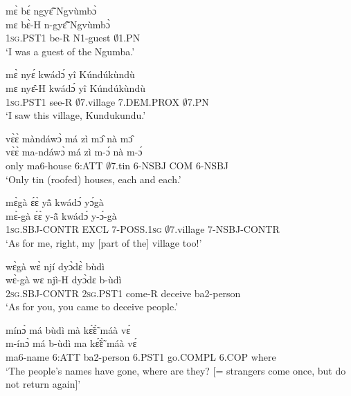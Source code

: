\begin{exe} 
\exC\label{42}
  \glll   mɛ̀ bɛ́ ngyɛ̃̂ Ngvùmbɔ̀ \\
          mɛ bɛ̀-H n-gyɛ̃̂ Ngvùmbɔ̀ \\
           1\textsc{sg}.PST1 be-R N1-guest $\emptyset$1.PN  \\
    \trans `I was a guest of the Ngumba.'
\end{exe}

\begin{exe} 
\exC\label{43} 
  \glll  mɛ̀ nyɛ́ kwádɔ́ yî Kúndúkùndù \\
         mɛ nyɛ̂-H kwádɔ́ yî Kúndúkùndù \\
            1\textsc{sg}.PST1 see-R $\emptyset$7.village 7.DEM.PROX $\emptyset$7.PN\\
    \trans `I saw this village, Kundukundu.'
\end{exe}

\begin{exe} 
\exC\label{44}
  \glll   vɛ̀ɛ̀ màndáwɔ̀ má zì mɔ̂ nà mɔ̂ \\
          vɛ̀ɛ̀ ma-ndáwɔ̀ má zì m-ɔ́ nà m-ɔ́ \\
           only ma6-house 6:ATT $\emptyset$7.tin 6-NSBJ COM 6-NSBJ  \\
    \trans `Only tin (roofed) houses, each and each.'
\end{exe}

\begin{exe} 
\exC\label{45} 
  \glll   mɛ̀gà ɛ́ɛ̀ yã̂ kwádɔ́ yɔ́gà \\
          mɛ̀-gà ɛ́ɛ̀ y-ã̂ kwádɔ́ y-ɔ́-gà \\
            1\textsc{sg}.SBJ-CONTR EXCL 7-POSS.1\textsc{sg} $\emptyset$7.village 7-NSBJ-CONTR \\
    \trans `As for me, right, my [part of the] village too!'
\end{exe}

\begin{exe} 
\exC\label{46} 
  \glll  wɛ̀gà wɛ̀ njí dyɔ̀dɛ̀ bùdì \\
         wɛ̀-gà wɛ njì-H dyɔ̀dɛ b-ùdì \\
          2\textsc{sg}.SBJ-CONTR 2\textsc{sg}.PST1 come-R deceive ba2-person   \\
    \trans `As for you, you came to deceive people.'
\end{exe}

\begin{exe} 
\exC\label{47} 
  \glll   mínɔ̀ má bùdì mà kɛ̃́ɛ̃̀ máà vɛ́ \\
          m-ínɔ̀ má b-ùdì ma kɛ̃́ɛ̃̀ máà vɛ́ \\
            ma6-name 6:ATT ba2-person 6.PST1 go.COMPL 6.COP where \\
    \trans `The people's names have gone, where are they? [= strangers come once, but do not return again]'
\end{exe}

